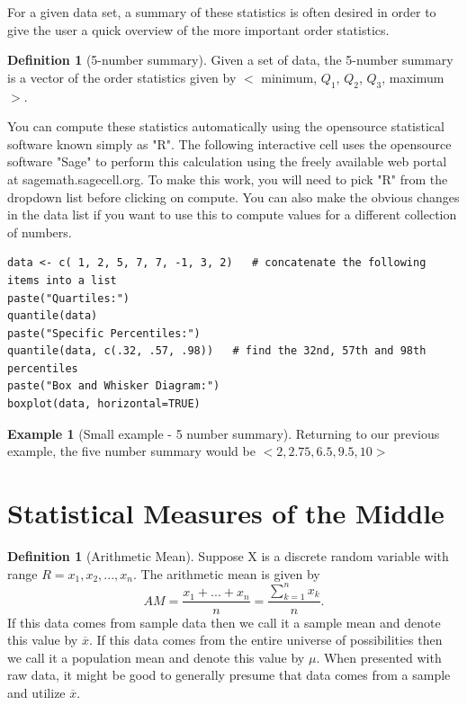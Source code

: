 \documentclass[10pt,]{book}
\theoremstyle{plain}
\theoremstyle{definition}
\newtheorem{definition}[theorem]{Definition}
\theoremstyle{definition}
\newtheorem{example}[theorem]{Example}
\theoremstyle{definition}
\numberwithin{equation}{section}
\newcommand{\lt}{ < }
\newcommand{\gt}{ > }
\begin{document}
	For a given data set, a summary of these statistics is often desired in order to give the user a quick overview of the more important order statistics.
\begin{definition}[{5-number summary}]\label{definition-6}
Given a set of data, the 5-number summary is a vector of the order statistics given by \(\lt\) minimum, \(Q_1\), \(Q_2\), \(Q_3\), maximum \(\gt\). 
\end{definition}
\par

You can compute these statistics automatically using the opensource statistical software known simply as "R".  The following interactive cell uses the opensource software "Sage" to perform this calculation using the freely available web portal at sagemath.sagecell.org.  To make this work, you will need to pick "R" from the dropdown list before clicking on compute. You can also make the obvious changes in the data list if you want to use this to compute values for a different collection of numbers.
%
\begin{lstlisting}[style=sageinput]
data <- c( 1, 2, 5, 7, 7, -1, 3, 2)   # concatenate the following items into a list
paste("Quartiles:")
quantile(data)
paste("Specific Percentiles:")
quantile(data, c(.32, .57, .98))   # find the 32nd, 57th and 98th percentiles
paste("Box and Whisker Diagram:")
boxplot(data, horizontal=TRUE)
\end{lstlisting}
\begin{example}[Small example - 5 number summary]\label{example-5}
Returning to our previous example, the five number summary would be
	\(\lt 2, 2.75, 6.5, 9.5, 10 \gt\)
\end{example}
\typeout{************************************************}
\typeout{************************************************}
\section[{Statistical Measures of the Middle}]{Statistical Measures of the Middle}\label{section-4}
\begin{definition}[{Arithmetic Mean}]\label{definition-7}
Suppose X is a discrete random variable with range 
	\(R = {x_1, x_2, ..., x_n}\). 
	The arithmetic mean is given by
		\begin{equation*}
		AM = \frac{x_1 + ... + x_n}{n} = \frac{\sum_{k=1}^n x_k}{n}.
		\end{equation*}
	If this data comes from sample data then we call it a sample mean and denote this value by \(\overline{x}\). If this data comes from the entire universe of possibilities then we call it a population mean and denote this value by \(\mu\).  When presented with raw data, it might be good to generally presume that data comes from a sample and utilize \(\overline{x}\).%
\end{definition}
\end{document}
